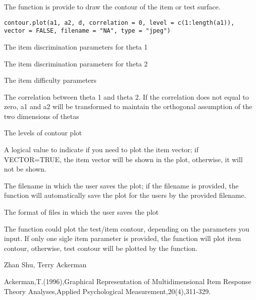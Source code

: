 \begin{Description}\relax
The function is provide to draw the contour of the item or test surface.
\end{Description}
\begin{Usage}
\begin{verbatim}
contour.plot(a1, a2, d, correlation = 0, level = c(1:length(a1)), vector = FALSE, filename = "NA", type = "jpeg")
\end{verbatim}
\end{Usage}
\begin{Arguments}
\begin{ldescription}
\item[\code{a1}] The item discrimination parameters for theta 1 
\item[\code{a2}] The item discrimination parameters for theta 2 
\item[\code{d}] The item difficulty parameters 
\item[\code{correlation}] The correlation between theta 1 and theta 2. If the correlation does not equal to zero, a1 and a2 will be transformed to maintain the orthogonal assumption of the two dimensions of thetas 
\item[\code{level}] The levels of contour plot 
\item[\code{vector}] A logical value to indicate if you need to plot the item vector; if VECTOR=TRUE, the item vector will be shown in the plot, otherwise, it will not be shown. 
\item[\code{filename}] The filename in which the user saves the plot; if the filename is provided, the function will automatically save the plot for the users by the provided filename.  
\item[\code{type}] The format of files in which the user saves the plot 
\end{ldescription}
\end{Arguments}
\begin{Details}\relax
The function could plot the test/item contour, depending on the parameters you input. If only one sigle item parameter is provided, the function will plot item contour, otherwise, test contour will be plotted by 
the function.
\end{Details}
\begin{Author}\relax
Zhan Shu, Terry Ackerman
\end{Author}
\begin{References}\relax
Ackerman,T.(1996),Graphical Representation of Multidimensional Item Response Theory Analyses,Applied Psychological Measurement,20(4),311-329.
\end{References}
